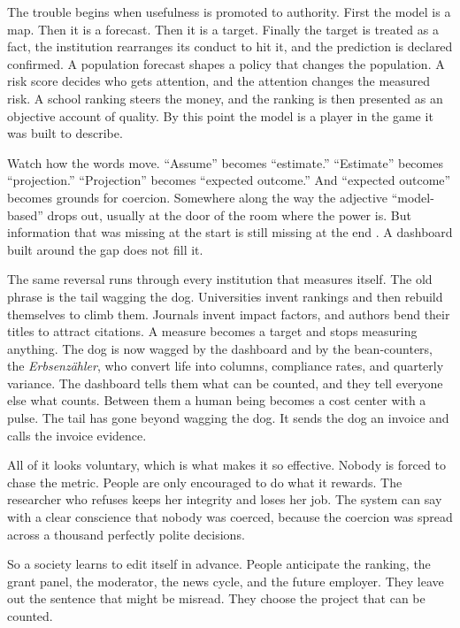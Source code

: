 \documentclass[12pt,a4paper]{book}
\begin{document}
The trouble begins when usefulness is promoted to authority. First the model is a map. Then it is a forecast. Then it is a target. Finally the target is treated as a fact, the institution rearranges its conduct to hit it, and the prediction is declared confirmed. A population forecast shapes a policy that changes the population. A risk score decides who gets attention, and the attention changes the measured risk. A school ranking steers the money, and the ranking is then presented as an objective account of quality. By this point the model is a player in the game it was built to describe.

Watch how the words move. ``Assume'' becomes ``estimate.'' ``Estimate'' becomes ``projection.'' ``Projection'' becomes ``expected outcome.'' And ``expected outcome'' becomes grounds for coercion. Somewhere along the way the adjective ``model-based'' drops out, usually at the door of the room where the power is. But information that was missing at the start is still missing at the end \cite{brillouin2}. A dashboard built around the gap does not fill it.

The same reversal runs through every institution that measures itself. The old phrase is the tail wagging the dog. Universities invent rankings and then rebuild themselves to climb them. Journals invent impact factors, and authors bend their titles to attract citations. A measure becomes a target and stops measuring anything. The dog is now wagged by the dashboard and by the bean-counters, the \emph{Erbsenz\"ahler}, who convert life into columns, compliance rates, and quarterly variance. The dashboard tells them what can be counted, and they tell everyone else what counts. Between them a human being becomes a cost center with a pulse. The tail has gone beyond wagging the dog. It sends the dog an invoice and calls the invoice evidence.

All of it looks voluntary, which is what makes it so effective. Nobody is forced to chase the metric. People are only encouraged to do what it rewards. The researcher who refuses keeps her integrity and loses her job. The system can say with a clear conscience that nobody was coerced, because the coercion was spread across a thousand perfectly polite decisions.

So a society learns to edit itself in advance. People anticipate the ranking, the grant panel, the moderator, the news cycle, and the future employer. They leave out the sentence that might be misread. They choose the project that can be counted.
\end{document}
